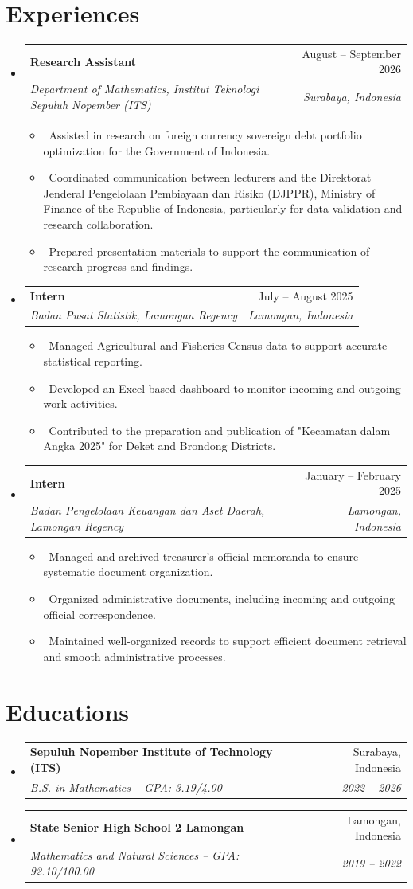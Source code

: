\documentclass[letterpaper,10pt]{article}
\makeatletter
\newcommand{\resumeItem}[1]{\item\small{#1}}
\newcommand{\resumeSubheading}[4]{
\vspace{-1pt}\item
  \begin{tabular*}{0.97\textwidth}[t]{l@{\extracolsep{\fill}}r}
    \textbf{#1} & #2 \\
    \textit{#3} & \textit{#4} \\
  \end{tabular*}\vspace{-7pt}
}
\newcommand{\resumeSubHeadingList}{\begin{itemize}[leftmargin=0.15in, label={}]}
\newcommand{\resumeSubHeadingListEnd}{\end{itemize}}
\makeatother
\begin{document}
\section{Experiences}
\resumeSubHeadingList
  \resumeSubheading
      {Research Assistant}{August -- September 2026}{Department of Mathematics, Institut Teknologi Sepuluh Nopember (ITS)}{Surabaya, Indonesia}\resumeSubHeadingList
      \resumeItem{\textbullet\ Assisted in research on foreign currency sovereign debt portfolio optimization for the Government of Indonesia.}
      \resumeItem{\textbullet\ Coordinated communication between lecturers and the Direktorat Jenderal Pengelolaan Pembiayaan dan Risiko (DJPPR), Ministry of Finance of the Republic of Indonesia, particularly for data validation and research collaboration.}
      \resumeItem{\textbullet\ Prepared presentation materials to support the communication of research progress and findings.}
      \resumeSubHeadingListEnd
  \resumeSubheading
      {Intern}{July -- August 2025}
      {Badan Pusat Statistik, Lamongan Regency}{Lamongan, Indonesia}
      \resumeSubHeadingList
          \resumeItem{\textbullet\ Managed Agricultural and Fisheries Census data to support accurate statistical reporting.}
          \resumeItem{\textbullet\ Developed an Excel-based dashboard to monitor incoming and outgoing work activities.}
          \resumeItem{\textbullet\ Contributed to the preparation and publication of "Kecamatan dalam Angka 2025" for Deket and Brondong Districts.}
      \resumeSubHeadingListEnd
  \resumeSubheading
      {Intern}{January -- February 2025}
      {Badan Pengelolaan Keuangan dan Aset Daerah, Lamongan Regency}{Lamongan, Indonesia}
      \resumeSubHeadingList
          \resumeItem{\textbullet\ Managed and archived treasurer's official memoranda to ensure systematic document organization.}
          \resumeItem{\textbullet\ Organized administrative documents, including incoming and outgoing official correspondence.}
          \resumeItem{\textbullet\ Maintained well-organized records to support efficient document retrieval and smooth administrative processes.}
      \resumeSubHeadingListEnd
\resumeSubHeadingListEnd

\section{Educations}
\resumeSubHeadingList
  \resumeSubheading
      {Sepuluh Nopember Institute of Technology (ITS)}{Surabaya, Indonesia}
      {B.S. in Mathematics -- GPA: 3.19/4.00}{2022 -- 2026}
  \resumeSubheading
      {State Senior High School 2 Lamongan}{Lamongan, Indonesia}
      {Mathematics and Natural Sciences -- GPA: 92.10/100.00}{2019 -- 2022}
\resumeSubHeadingListEnd
\end{document}
